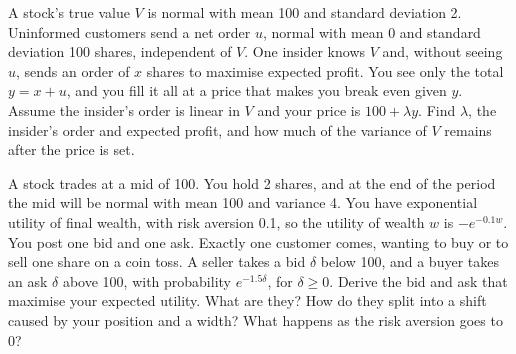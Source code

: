 \begin{question}\label{iq:iv2:making-a-market:34}
A stock's true value $V$ is normal with mean 100 and standard deviation 2. Uninformed customers send a net order $u$, normal with mean 0 and standard deviation 100 shares, independent of $V$. One insider knows $V$ and, without seeing $u$, sends an order of $x$ shares to maximise expected profit. You see only the total $y = x + u$, and you fill it all at a price that makes you break even given $y$. Assume the insider's order is linear in $V$ and your price is $100 + \lambda y$. Find $\lambda$, the insider's order and expected profit, and how much of the variance of $V$ remains after the price is set.
\end{question}

\begin{question}\label{iq:iv2:making-a-market:35}
A stock trades at a mid of 100. You hold 2 shares, and at the end of the period the mid will be normal with mean 100 and variance 4. You have exponential utility of final wealth, with risk aversion 0.1, so the utility of wealth $w$ is $-e^{-0.1 w}$. You post one bid and one ask. Exactly one customer comes, wanting to buy or to sell one share on a coin toss. A seller takes a bid $\delta$ below 100, and a buyer takes an ask $\delta$ above 100, with probability $e^{-1.5\delta}$, for $\delta \ge 0$. Derive the bid and ask that maximise your expected utility. What are they? How do they split into a shift caused by your position and a width? What happens as the risk aversion goes to 0?
\end{question}
